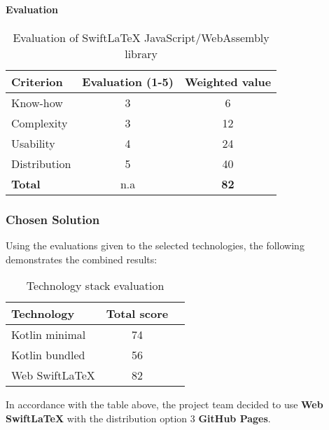 \paragraph{Evaluation}\mbox{}\newline
\begin{table}[H]
    \centering
    \begin{tabular}{|l|c|c|}
        \hline
        \textbf{Criterion} & \textbf{Evaluation (1-5)} & \textbf{Weighted value} \\
        \hline
        Know-how & 3 & 6 \\
        \hline
        Complexity & 3 & 12 \\
        \hline
        Usability & 4 & 24 \\
        \hline
        Distribution & 5 & 40 \\
        \hline
        \textbf{Total} & n.a & \textbf{82} \\
        \hline
    \end{tabular}
    \caption{Evaluation of SwiftLaTeX JavaScript/WebAssembly library}
    \label{table:swiftlatex_evaluation}
\end{table}

\subsubsection{Chosen Solution}
Using the evaluations given to the selected technologies, the following demonstrates the combined results:
\begin{table}[H]
    \centering
    \begin{tabular}{|l|c|c|}
        \hline
        \textbf{Technology} & \textbf{Total score} \\
        \hline
        Kotlin minimal & 74 \\
        \hline
        Kotlin bundled & 56 \\
        \hline
        Web SwiftLaTeX & 82 \\
        \hline
    \end{tabular}
    \caption{Technology stack evaluation}
    \label{table:technology_evaluation}
\end{table}
In accordance with the table above, the project team decided to use \textbf{Web SwiftLaTeX} with the distribution option 3 \textbf{GitHub Pages}.

